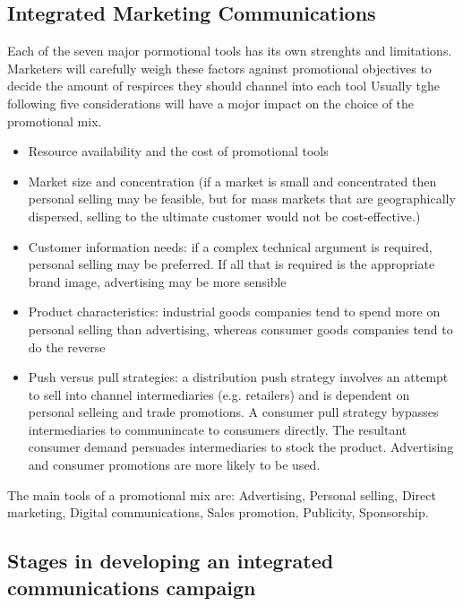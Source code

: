 \documentclass{article}
\begin{document}
\subsection{Integrated Marketing Communications}
Each of the seven major pormotional tools has its own strenghts and limitations. Marketers will carefully weigh these factors against promotional objectives to decide the amount of respirces they should channel into each tool Usually tghe following five considerations will have a mojor impact on the choice of the promotional mix.

\begin{itemize}
    \item Resource availability and the cost of promotional tools
    
    \item Market size and concentration (if a market is small and concentrated then personal selling may be feasible, but for mass markets that are geographically dispersed, selling to the ultimate customer would not be cost-effective.)
    
    \item Customer information needs: if a complex technical argument is required, personal selling may be preferred. If all that is required is the appropriate brand image, advertising may be more sensible

    \item Product characteristics: industrial goods companies tend to spend more on personal selling than advertising, whereas consumer goods companies tend to do the reverse

    \item Push versus pull strategies: a distribution push strategy involves an attempt to sell into channel intermediaries (e.g. retailers) and is dependent on personal selleing and trade promotions. A consumer pull strategy bypasses intermediaries to communincate to consumers directly. The resultant consumer demand persuades intermediaries to stock the product. Advertising and consumer promotions are more likely to be used.
\end{itemize}

The main tools of a promotional mix are: Advertising, Personal selling, Direct marketing, Digital communications, Sales promotion, Publicity, Sponsorship.

\subsection{Stages in developing an integrated communications campaign}
\end{document}
